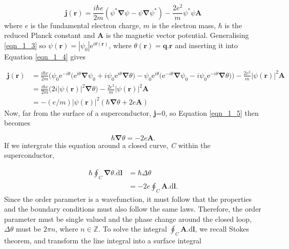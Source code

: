 \begin{equation}
\mathbf{j}(\mathbf{r}) = \frac{i\hbar e}{2m}(\psi^*\mathbf{\nabla}\psi-\psi\mathbf{\nabla}\psi^*)-\frac{2e^2}{m}\psi^*\psi\mathbf{A} \label{eqn_1_4}
\end{equation} where $e$ is the fundamental electron charge, $m$ is the electron mass, $\hbar$ is the  reduced Planck constant and \textbf{A} is the magnetic vector potential. Generalising \ref{eqn_1_3} so
 $\psi(\mathbf{r})=|\psi_0|\text{e}^{i\theta(\mathbf{r})}$, where $\theta(\mathbf{r})=\mathbf{q}.\mathbf{r}$ and inserting it into Equation \ref{eqn_1_4} gives %

\begin{equation}
	\begin{aligned}
		\mathbf{j}(\mathbf{r}) &=  \frac{i\hbar e}{2m}\Bigg(\psi_0\text{e}^{-i\theta}\Big(\text{e}^{i\theta}\mathbf{\nabla}\psi_0+i\psi_0\text{e}^{i\theta}\mathbf{\nabla}\theta\Big)-\psi_0\text{e}^{i\theta}\Big(\text{e}^{-i\theta}\mathbf{\nabla}\psi_0-i\psi_0\text{e}^{-i\theta}\mathbf{\nabla}\theta\Big)\Bigg)
	 -\frac{2e^2}{m}|\psi(\mathbf{r})|^2\mathbf{A} \\
	 &= \frac{i\hbar e}{2m}\Big(2i|\psi(\mathbf{r})|^2\mathbf{\nabla}\theta\Big)-\frac{2e^2}{m}|\psi(\mathbf{r})|^2\mathbf{A} \\
		&= -(e/m)|\psi(\mathbf{r})|^2(\hbar\mathbf{\nabla}\theta+2e\mathbf{A})\label{eqn_1_5}
	\end{aligned}
\end{equation} Now, far from the surface of a superconductor, \textbf{j}=0, so Equation \ref{eqn_1_5} then becomes 

\begin{equation}
\hbar\mathbf{\nabla}\theta = -2e\mathbf{A}. \label{eqn_1_6}
\end{equation} If we intergrate this equation around a closed curve, \textit{C} within the superconductor,

\begin{equation}
	\begin{aligned}
		\hbar \oint_C \mathbf{\nabla}\theta.\text{d}\mathbf{l} &= \hbar\Delta\theta \\
		&= -2e\oint_C \mathbf{A}.\text{d}\mathbf{l}.
	\end{aligned} 
\end{equation} Since the order parameter is a wavefunction, it must follow that the properties and the boundary conditions must also follow the same laws. Therefore, the order parameter must be single valued and the phase change around the closed loop, $\Delta\theta$ must be $2\pi n$, where $n \in \mathbb{Z}$. To solve the integral $\oint_C \mathbf{A}.\text{d}\mathbf{l}$, we recall Stokes theorem, and transform the line integral into a surface integral 

